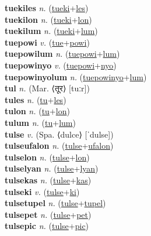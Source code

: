 \textbf{tuekiles} \textit{n.} (\hyperref[tueki]{tueki}+\hyperref[les]{les})
 \label{tuekiles} \\
\textbf{tuekilon} \textit{n.} (\hyperref[tueki]{tueki}+\hyperref[lon]{lon})
 \label{tuekilon} \\
\textbf{tuekilum} \textit{n.} (\hyperref[tueki]{tueki}+\hyperref[lum]{lum})
 \label{tuekilum} \\
\textbf{tuepowi} \textit{v.} (\hyperref[tue]{tue}+\hyperref[powi]{powi})
 \label{tuepowi} \\
\textbf{tuepowilum} \textit{n.} (\hyperref[tuepowi]{tuepowi}+\hyperref[lum]{lum})
 \label{tuepowilum} \\
\textbf{tuepowinyo} \textit{v.} (\hyperref[tuepowi]{tuepowi}+\hyperref[nyo]{nyo})
 \label{tuepowinyo} \\
\textbf{tuepowinyolum} \textit{n.} (\hyperref[tuepowinyo]{tuepowinyo}+\hyperref[lum]{lum})
 \label{tuepowinyolum} \\
\textbf{tul} \textit{n.} (Mar. ⟨तूर⟩ [tuːr])
 \label{tul} \\
\textbf{tules} \textit{n.} (\hyperref[tu]{tu}+\hyperref[les]{les})
 \label{tules} \\
\textbf{tulon} \textit{n.} (\hyperref[tu]{tu}+\hyperref[lon]{lon})
 \label{tulon} \\
\textbf{tulum} \textit{n.} (\hyperref[tu]{tu}+\hyperref[lum]{lum})
 \label{tulum} \\
\textbf{tulse} \textit{v.} (Spa. ⟨dulce⟩ [ˈdulse])
 \label{tulse} \\
\textbf{tulseufalon} \textit{n.} (\hyperref[tulse]{tulse}+\hyperref[ufalon]{ufalon})
 \label{tulseufalon} \\
\textbf{tulselon} \textit{n.} (\hyperref[tulse]{tulse}+\hyperref[lon]{lon})
 \label{tulselon} \\
\textbf{tulselyan} \textit{n.} (\hyperref[tulse]{tulse}+\hyperref[lyan]{lyan})
 \label{tulselyan} \\
\textbf{tulsekas} \textit{n.} (\hyperref[tulse]{tulse}+\hyperref[kas]{kas})
 \label{tulsekas} \\
\textbf{tulseki} \textit{v.} (\hyperref[tulse]{tulse}+\hyperref[ki]{ki})
 \label{tulseki} \\
\textbf{tulsetupel} \textit{n.} (\hyperref[tulse]{tulse}+\hyperref[tupel]{tupel})
 \label{tulsetupel} \\
\textbf{tulsepet} \textit{n.} (\hyperref[tulse]{tulse}+\hyperref[pet]{pet})
 \label{tulsepet} \\
\textbf{tulsepic} \textit{n.} (\hyperref[tulse]{tulse}+\hyperref[pic]{pic})
